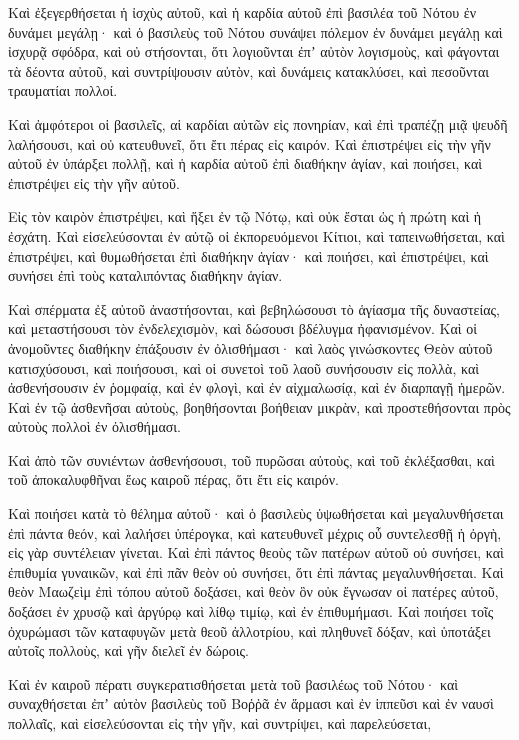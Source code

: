 {Καὶ ἐξεγερθήσεται ἡ ἰσχὺς αὐτοῦ, καὶ ἡ καρδία αὐτοῦ ἐπὶ βασιλέα τοῦ Νότου ἐν δυνάμει μεγάλῃ· καὶ ὁ βασιλεὺς τοῦ Νότου συνάψει πόλεμον ἐν δυνάμει μεγάλῃ καὶ ἰσχυρᾷ σφόδρα, καὶ οὐ στήσονται, ὅτι λογιοῦνται ἐπʼ αὐτὸν λογισμοὺς,
καὶ φάγονται τὰ δέοντα αὐτοῦ, καὶ συντρίψουσιν αὐτὸν, καὶ δυνάμεις κατακλύσει, καὶ πεσοῦνται τραυματίαι πολλοί.
\par }{\PP {}Καὶ ἀμφότεροι οἱ βασιλεῖς, αἱ καρδίαι αὐτῶν εἰς πονηρίαν, καὶ ἐπὶ τραπέζῃ μιᾷ ψευδῆ λαλήσουσι, καὶ οὐ κατευθυνεῖ, ὅτι ἔτι πέρας εἰς καιρόν.
Καὶ ἐπιστρέψει εἰς τὴν γῆν αὐτοῦ ἐν ὑπάρξει πολλῇ, καὶ ἡ καρδία αὐτοῦ ἐπὶ διαθήκην ἁγίαν, καὶ ποιήσει, καὶ ἐπιστρέψει εἰς τὴν γῆν αὐτοῦ.
\par }{\PP {}Εἰς τὸν καιρὸν ἐπιστρέψει, καὶ ἥξει ἐν τῷ Νότῳ, καὶ οὐκ ἔσται ὡς ἡ πρώτη καὶ ἡ ἐσχάτη.
Καὶ εἰσελεύσονται ἐν αὐτῷ οἱ ἐκπορευόμενοι Κίτιοι, καὶ ταπεινωθήσεται, καὶ ἐπιστρέψει, καὶ θυμωθήσεται ἐπὶ διαθήκην ἁγίαν· καὶ ποιήσει, καὶ ἐπιστρέψει, καὶ συνήσει ἐπὶ τοὺς καταλιπόντας διαθήκην ἁγίαν.
\par }{\PP {}Καὶ σπέρματα ἐξ αὐτοῦ ἀναστήσονται, καὶ βεβηλώσουσι τὸ ἁγίασμα τῆς δυναστείας, καὶ μεταστήσουσι τὸν ἐνδελεχισμὸν, καὶ δώσουσι βδέλυγμα ἠφανισμένον.
Καὶ οἱ ἀνομοῦντες διαθήκην ἐπάξουσιν ἐν ὀλισθήμασι· καὶ λαὸς γινώσκοντες Θεὸν αὐτοῦ κατισχύσουσι, καὶ ποιήσουσι,
καὶ οἱ συνετοὶ τοῦ λαοῦ συνήσουσιν εἰς πολλὰ, καὶ ἀσθενήσουσιν ἐν ῥομφαίᾳ, καὶ ἐν φλογὶ, καὶ ἐν αἰχμαλωσίᾳ, καὶ ἐν διαρπαγῇ ἡμερῶν.
Καὶ ἐν τῷ ἀσθενῆσαι αὐτοὺς, βοηθήσονται βοήθειαν μικρὰν, καὶ προστεθήσονται πρὸς αὐτοὺς πολλοὶ ἐν ὀλισθήμασι.
\par }{\PP {}Καὶ ἀπὸ τῶν συνιέντων ἀσθενήσουσι, τοῦ πυρῶσαι αὐτοὺς, καὶ τοῦ ἐκλέξασθαι, καὶ τοῦ ἀποκαλυφθῆναι ἕως καιροῦ πέρας, ὅτι ἔτι εἰς καιρόν.
\par }{\PP {}Καὶ ποιήσει κατὰ τὸ θέλημα αὐτοῦ· καὶ ὁ βασιλεὺς ὑψωθήσεται καὶ μεγαλυνθήσεται ἐπὶ πάντα θεόν, καὶ λαλήσει ὑπέρογκα, καὶ κατευθυνεῖ μέχρις οὗ συντελεσθῇ ἡ ὀργὴ, εἰς γὰρ συντέλειαν γίνεται.
Καὶ ἐπὶ πάντος θεοὺς τῶν πατέρων αὐτοῦ οὐ συνήσει, καὶ ἐπιθυμία γυναικῶν, καὶ ἐπὶ πᾶν θεὸν οὐ συνήσει, ὅτι ἐπὶ πάντας μεγαλυνθήσεται.
Καὶ θεὸν Μαωζεὶμ ἐπὶ τόπου αὐτοῦ δοξάσει, καὶ θεὸν ὃν οὐκ ἔγνωσαν οἱ πατέρες αὐτοῦ, δοξάσει ἐν χρυσῷ καὶ ἀργύρῳ καὶ λίθῳ τιμίῳ, καὶ ἐν ἐπιθυμήμασι.
Καὶ ποιήσει τοῖς ὀχυρώμασι τῶν καταφυγῶν μετὰ θεοῦ ἀλλοτρίου, καὶ πληθυνεῖ δόξαν, καὶ ὑποτάξει αὐτοῖς πολλοὺς, καὶ γῆν διελεῖ ἐν δώροις.
\par }{\PP {}Καὶ ἐν καιροῦ πέρατι συγκερατισθήσεται μετὰ τοῦ βασιλέως τοῦ Νότου· καὶ συναχθήσεται ἐπʼ αὐτὸν βασιλεὺς τοῦ Βοῤῥᾶ ἐν ἅρμασι καὶ ἐν ἱππεῦσι καὶ ἐν ναυσὶ πολλαῖς, καὶ εἰσελεύσονται εἰς τὴν γῆν, καὶ συντρίψει, καὶ παρελεύσεται,
}
